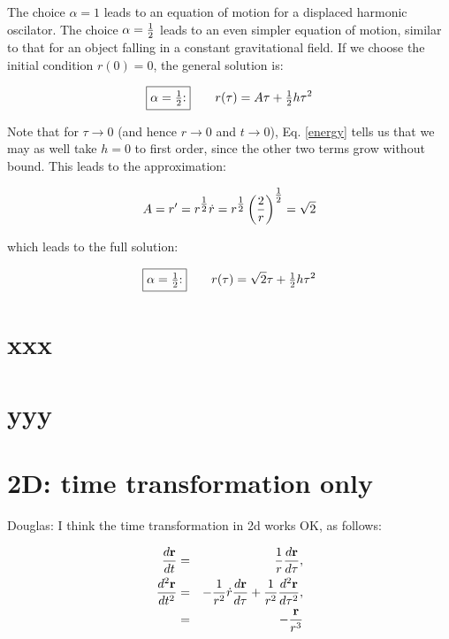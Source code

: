 The choice $\alpha=1$ leads to an equation of motion for a displaced
harmonic oscilator.  The choice $\alpha={\textstyle {1 \over 2}}$ leads to an even
simpler equation of motion, similar to that for an object falling in a
constant gravitational field.  If we choose the initial condition $r(0)=0$,
the general solution is:

\begin{equation}
\fbox{$\alpha={\textstyle {1 \over 2}}$:}\qquad r(\tau) = A\tau + {\textstyle {1 \over 2}} h \tau^2
\end{equation}

Note that for $\tau \rightarrow 0$ (and hence $r \rightarrow 0$ and
$t \rightarrow 0$), Eq. \ref{energy} tells us that we may as well
take $h=0$ to first order, since the other two terms grow without bound.
This leads to the approximation:

\begin{equation}
A=r'=r^{\textstyle {1 \over 2}} \dot r = r^{\textstyle {1 \over 2}} \left( \frac{2}{r} \right)^{\textstyle {1 \over 2}} = \sqrt{2}
\end{equation}

which leads to the full solution:

\begin{equation}
\fbox{$\alpha={\textstyle {1 \over 2}}$:}\qquad r(\tau) = \sqrt{2}\tau + {\textstyle {1 \over 2}} h \tau^2
\end{equation}





\section{xxx}

\section{yyy}

\section{2D: time transformation only}

Douglas: I think the time transformation in 2d works OK, as follows:

\begin{eqnarray}
{d{\bf r}\over dt} &=& {1\over r}{d{\bf r}\over d\tau}, \\
{d^2{\bf r}\over dt^2} &=&
-{1\over r^2}\dot r{d{\bf r}\over d\tau} + {1\over r^2}{d^2{\bf r}\over d\tau^2}, \\
&=& -{{\bf r}\over r^3}
\end{eqnarray}


